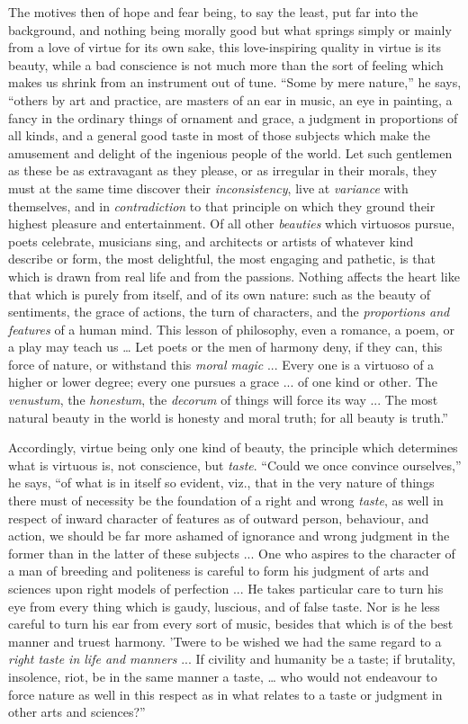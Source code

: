 The motives then of hope and fear being, to say the least, put far
into the background, and nothing being morally good but what springs
simply or mainly from a love of virtue for its own sake, this
love-inspiring quality in virtue is its beauty, while a bad conscience
is not much more than the sort of feeling which makes us shrink from
an instrument out of tune. ``Some by mere nature,'' he says,
``others by art and practice, are masters of an ear in music, an
eye in painting, a fancy in the ordinary things of ornament and grace,
a judgment in proportions of all kinds, and a general good taste in
most of those subjects which make the amusement and delight of the
ingenious people of the world. Let such gentlemen as these be as
extravagant as they please, or as irregular in their morals, they must
at the same time discover their \emph{inconsistency}, live at \emph{variance}
with themselves, and in \emph{contradiction} to that principle on
which they ground their highest pleasure and entertainment. Of all
other \emph{beauties} which virtuosos pursue, poets celebrate,
musicians sing, and architects or artists of whatever kind describe or
form, the most delightful, the most engaging and pathetic, is that
which is drawn from real life and from the passions. Nothing affects
the heart like that which is purely from itself, and of its own
nature: such as the beauty of sentiments, the grace of actions, the
turn of characters, and the \emph{proportions and features} of a human
mind. This lesson of philosophy, even a romance, a poem, or a play may
teach us … Let poets or the men of harmony deny, if they can, this
force of nature, or withstand this \emph{moral magic} ... Every one is
a virtuoso of a higher or lower degree; every one pursues a grace ...
of one kind or other. The \emph{venustum}, the \emph{honestum}, the \emph{decorum}
of things will force its way ... The most natural beauty in the world
is honesty and moral truth; for all beauty is truth.''

Accordingly, virtue being only one kind of beauty, the principle
which determines what is virtuous is, not conscience, but \emph{taste}.
``Could we once convince ourselves,'' he says, ``of what
is in itself so evident, viz., that in the very nature of things there
must of necessity be the foundation of a right and wrong \emph{taste},
as well in respect of inward character of features as of outward
person, behaviour, and action, we should be far more ashamed of
ignorance and wrong judgment in the former than in the latter of these
subjects ... One who aspires to the character of a man of breeding and
politeness is careful to form his judgment of arts and sciences upon
right models of perfection ... He takes particular care to turn his
eye from every thing which is gaudy, luscious, and of false taste. Nor
is he less careful to turn his ear from every sort of music, besides
that which is of the best manner and truest harmony. 'Twere to be
wished we had the same regard to a \emph{right taste in life and manners}
... If civility and humanity be a taste; if brutality, insolence,
riot, be in the same manner a taste, … who would not endeavour to
force nature as well in this respect as in what relates to a
taste or judgment in other arts and sciences?''

